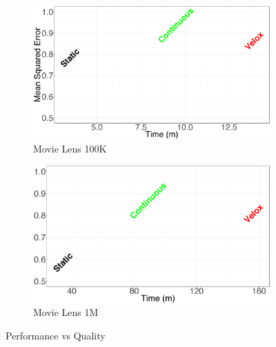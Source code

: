 \documentclass{vldb}
\begin{document}
\begin{figure}[h]
\begin{subfigure}{.5\textwidth}
  \includegraphics[width=\linewidth]{../images/experiment-results/movie-lens-100k-systems.eps}
  \caption{Movie Lens 100K}
  \label{fig:sfig2}
\end{subfigure}%
\begin{subfigure}{0.5\textwidth}
  \includegraphics[width=\linewidth]{../images/experiment-results/movie-lens-1m-systems.eps}
  \caption{Movie Lens 1M}
  \label{fig:sfig1}
\end{subfigure}

\caption{Performance vs Quality}
\label{fig:fig}
\end{figure}
\end{document}
